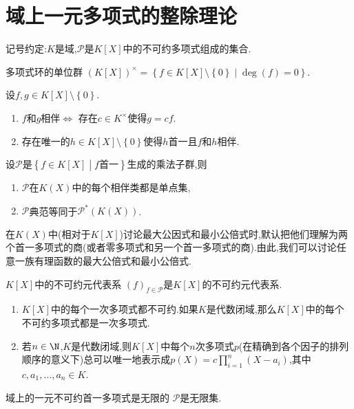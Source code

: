 \section{域上一元多项式的整除理论}

记号约定:$K$是域,$\mathcal{P}$是$K[X]$中的不可约多项式组成的集合.

\begin{proposition}{多项式环的单位群}{}
	$(K[X])^{\times}=\left\{f\in K[X]\setminus\left\{0\right\}\middle|\deg\left(f\right)=0\right\}$.
\end{proposition}

\begin{proposition}{}{}
	设$f,g\in K[X]\setminus\left\{0\right\}$.
	\begin{enumerate}
		\item $f$和$g$相伴$\iff$ 存在$c\in K^{\times}$使得$g=cf$.
		\item 存在唯一的$h\in K[X]\setminus\left\{0\right\}$使得$h$首一且$f$和$h$相伴.
	\end{enumerate}
\end{proposition}

\begin{proposition}{}{}
	设$\mathcal{P}$是$\left\{f\in K[X]\middle|f\text{首一}\right\}$生成的乘法子群,则
	\begin{enumerate}
		\item $\mathcal{P}$在$K(X)$中的每个相伴类都是单点集,
		\item $\mathcal{P}$典范等同于$\mathscr{P}^{\ast}\left(K(X)\right)$.
	\end{enumerate}
\end{proposition}

\begin{remark}{}{}
	在$K(X)$中(相对于$K[X]$)讨论最大公因式和最小公倍式时,默认把他们理解为两个首一多项式的商(或者零多项式和另一个首一多项式的商).由此,我们可以讨论任意一族有理函数的最大公倍式和最小公倍式.
\end{remark}

\begin{proposition}{$K[X]$中的不可约元代表系}{}
	$\left(f\right)_{f\in\mathcal{P}}$是$K[X]$的不可约元代表系.
\end{proposition}

\begin{remark}{}{}
	\begin{enumerate}
		\item $K[X]$中的每个一次多项式都不可约.如果$K$是代数闭域,那么$K[X]$中的每个不可约多项式都是一次多项式.
		\item 若$n\in\N$,$K$是代数闭域,则$K[X]$中每个$n$次多项式$p$(在精确到各个因子的排列顺序的意义下)总可以唯一地表示成$p\left(X\right)=c\prod\limits_{i=1}^{n}\left(X-a_{i}\right)$,其中$c,a_{1},\ldots,a_{n}\in K$.
	\end{enumerate}
\end{remark}

\begin{proposition}{域上的一元不可约首一多项式是无限的}{}
	$\mathcal{P}$是无限集.
\end{proposition}